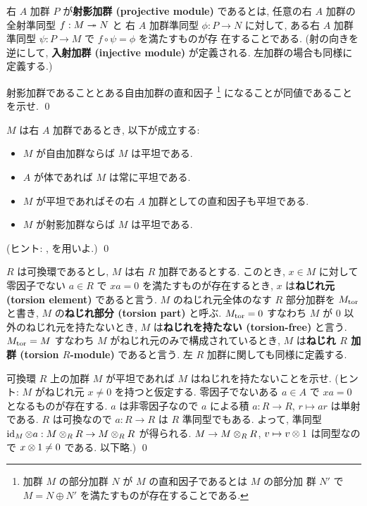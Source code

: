 \documentclass[12pt,twoside]{jarticle}
\begin{document}
\begin{question}
  右 $A$ 加群 $P$ が{\bf 射影加群 (projective module)} であるとは, 
  任意の右 $A$ 加群の全射準同型 $f:M\twoheadrightarrow N$ と
  右 $A$ 加群準同型 $\phi:P\to N$ に対して,
  ある右 $A$ 加群準同型 $\psi:P\to M$ で $f\circ\psi=\phi$ を満たすものが存
  在することである.  (射の向きを逆にして, {\bf 入射加群 (injective module)} 
  が定義される.  左加群の場合も同様に定義する.) 

  射影加群であることとある自由加群の直和因子%
  \footnote{加群 $M$ の部分加群 $N$ が $M$ の直和因子であるとは $M$ の部分加
    群 $N'$ で $M=N\oplus N'$ を満たすものが存在することである.}%
  になることが同値であることを示せ.  
  \qed
\end{question}

\begin{question}
  $M$ は右 $A$ 加群であるとき, 以下が成立する:
  \begin{itemize}
  \item[(1)] $M$ が自由加群ならば $M$ は平坦である.
  \item[(2)] $A$ が体であれば $M$ は常に平坦である.
  \item[(3)] $M$ が平坦であればその右 $A$ 加群としての直和因子も平坦である.
  \item[(4)] $M$ が射影加群ならば $M$ は平坦である.
  \end{itemize}
  (ヒント: ,  を用いよ.) \qed
\end{question}

\begin{question}[ねじれ部分と非平坦性]
  $R$ は可換環であるとし, $M$ は右 $R$ 加群であるとする.
  このとき, $x\in M$ に対して
  零因子でない $a\in R$ で $xa=0$ を満たすものが存在するとき,
  $x$ は{\bf ねじれ元 (torsion element)} であると言う.
  $M$ のねじれ元全体のなす $R$ 部分加群を $M_{\mathrm{tor}}$ と書き, 
  $M$ の{\bf ねじれ部分 (torsion part)} と呼ぶ.
  $M_{\mathrm{tor}} = 0$ すなわち $M$ が $0$ 以外のねじれ元を持たないとき, %
  $M$ は{\bf ねじれを持たない (torsion-free)} と言う.
  $M_{\mathrm{tor}} = M$ すなわち $M$ がねじれ元のみで構成されているとき, %
  $M$ は{\bf ねじれ $R$ 加群 (torsion $R$-module)} であると言う.
  左 $R$ 加群に関しても同様に定義する.

  可換環 $R$ 上の加群 $M$ が平坦であれば $M$ はねじれを持たないことを示せ.
  (ヒント: $M$ がねじれ元 $x\ne 0$ を持つと仮定する. 
  零因子でないある $a\in A$ で $xa=0$ となるものが存在する.
  $a$ は非零因子なので $a$ による積 $a:R\to R$, $r\mapsto ar$ は単射である.
  $R$ は可換なので $a:R\to R$ は $R$ 準同型でもある.
  よって, 準同型 $\mathop{\mathrm{id}}\nolimits_M\otimes a:M\otimes_R R\to M\otimes_R R$ が得られる.
  $M\to M\otimes_R R$, $v\mapsto v\otimes1$ は同型なので $x\otimes 1\ne 0$ である.
  以下略.)
  \qed
\end{question}
\end{document}
